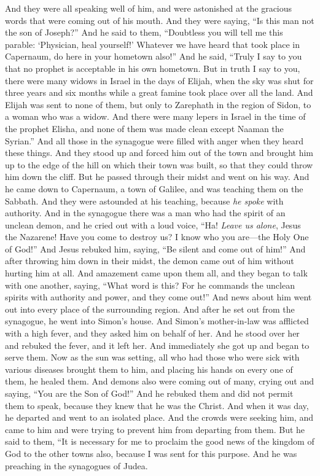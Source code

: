 \begin{biblechapter}
\verse And they were all speaking well of him, and were astonished at the gracious words that were coming out of his mouth. And they were saying, “Is this man not the son of Joseph?”
\verse And he said to them, “Doubtless you will tell me this parable: ‘Physician, heal yourself!’ Whatever we have heard that took place in Capernaum, do here in your hometown also!”
\verse And he said, “Truly I say to you that no prophet is acceptable in his own hometown.
\verse But in truth I say to you, there were many widows in Israel in the days of Elijah, when the sky was shut for three years and six months while a great famine took place over all the land.
\verse And Elijah was sent to none of them, but only to Zarephath in the region of Sidon, to a woman who was a widow.
\verse And there were many lepers in Israel in the time of the prophet Elisha, and none of them was made clean except Naaman the Syrian.”
\verse And all those in the synagogue were filled with anger when they heard these things.
\verse And they stood up and forced him out of the town and brought him up to the edge of the hill on which their town was built, so that they could throw him down the cliff.
\verse But he passed through their midst and went on his way.
 And he came down to Capernaum, a town of Galilee, and was teaching them on the Sabbath.
\verse And they were astounded at his teaching, because \textit{he spoke} with authority.
\verse And in the synagogue there was a man who had the spirit of an unclean demon, and he cried out with a loud voice,
\verse “Ha! \textit{Leave us alone}, Jesus the Nazarene! Have you come to destroy us? I know who you are—the Holy One of God!”
\verse And Jesus rebuked him, saying, “Be silent and come out of him!” And after throwing him down in their midst, the demon came out of him without hurting him at all.
\verse And amazement came upon them all, and they began to talk with one another, saying, “What word is this? For he commands the unclean spirits with authority and power, and they come out!”
\verse And news about him went out into every place of the surrounding region.
\verse And after he set out from the synagogue, he went into Simon’s house. And Simon’s mother-in-law was afflicted with a high fever, and they asked him on behalf of her.
\verse And he stood over her and rebuked the fever, and it left her. And immediately she got up and began to serve them.
\verse Now as the sun was setting, all who had those who were sick with various diseases brought them to him, and placing his hands on every one of them, he healed them.
\verse And demons also were coming out of many, crying out and saying, “You are the Son of God!” And he rebuked them and did not permit them to speak, because they knew that he was the Christ.
\verse And when it was day, he departed and went to an isolated place. And the crowds were seeking him, and came to him and were trying to prevent him from departing from them.
\verse But he said to them, “It is necessary for me to proclaim the good news of the kingdom of God to the other towns also, because I was sent for this purpose.
\verse And he was preaching in the synagogues of Judea.
\end{biblechapter}

